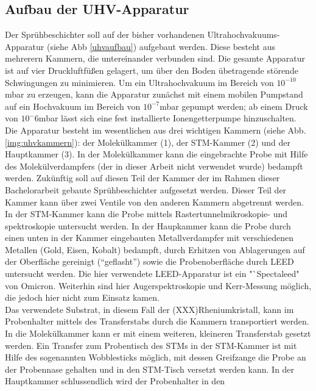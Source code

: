 \subsection{Aufbau der UHV-Apparatur}

Der Sprühbeschichter soll auf der bisher vorhandenen Ultrahochvakuums-Apparatur (siehe Abb
\ref{uhvaufbau}) aufgebaut werden.%
 Diese besteht aus mehrerern Kammern, die untereinander verbunden sind. Die gesamte Apparatur ist
auf vier Druckluftfüßen gelagert, um über den Boden übetragende störende Schwingungen zu minimieren. Um ein
Ultrahochvakuum im Bereich von $10^{-10}$mbar zu erzeugen, kann die Apparatur zunächst mit einem
mobilen Pumpstand %
auf ein Hochvakuum im Bereich von
$10^{-7}$mbar gepumpt werden; ab einem Druck von $10^-6$mbar lässt sich eine fest installierte
Ionengetterpumpe hinzuschalten.\\
Die Apparatur besteht im wesentlichen aus drei wichtigen Kammern (siehe Abb. \ref{img:uhvkammern}): der 
Molekülkammer (1), der STM-Kammer (2) und der Hauptkammer (3). In der Molekülkammer kann die eingebrachte
Probe mit Hilfe des Molekülverdampfers (der in dieser Arbeit nicht verwendet wurde) bedampft werden.
Zukünftig soll auf diesen Teil der Kammer der im Rahmen dieser Bachelorarbeit gebaute
Sprühbeschichter aufgesetzt werden. Dieser Teil der Kammer kann über zwei Ventile von den anderen
Kammern abgetrennt werden.\\
In der STM-Kammer kann die Probe
mittels Rastertunnelmikroskopie- und spektroskopie untersucht werden. In der Haupkammer kann die
Probe durch einen unten in der Kammer eingebauten Metallverdampfer mit
verschiedenen Metallen (Gold, Eisen, Kobalt) bedampft, durch Erhitzen von Ablagerungen auf der
Oberfläche gereinigt ("`geflasht"') sowie die Probenoberfläche durch LEED untersucht werden. Die
hier verwendete LEED-Apparatur ist ein "`Spectaleed"  von Omicron. 
Weiterhin sind hier Augerspektroskopie und Kerr-Messung möglich, die jedoch hier nicht zum Einsatz
kamen.\\
Das verwendete Substrat, in diesem Fall der (XXX)Rheniumkristall, kann im Probenhalter mittels des
Transferstabs durch die Kammern transportiert werden. In die Molekülkammer kann er mit einem
weiteren, kleineren Transferstab gesetzt werden. Ein Transfer zum Probentisch des STMs in der
STM-Kammer ist mit Hilfe des sogenannten Wobblesticks möglich, mit dessen Greifzange die Probe an der Probennase gehalten und in
den STM-Tisch versetzt werden kann. In der Hauptkammer schlussendlich wird der Probenhalter in den
